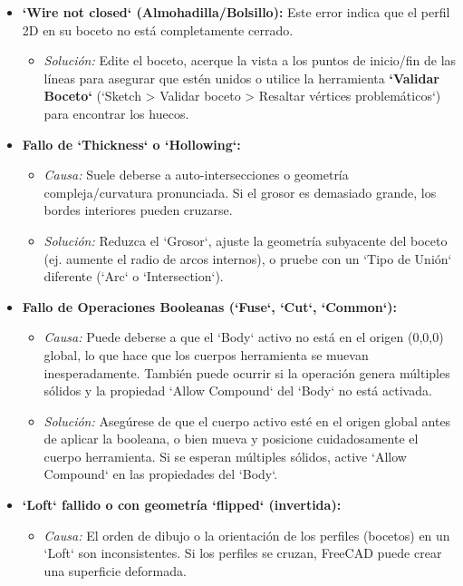 \documentclass[12pt]{article}
\begin{document}
\begin{itemize}[label=\textbullet]
    \item \textbf{`Wire not closed` (Almohadilla/Bolsillo):} Este error indica que el perfil 2D en su boceto no está completamente cerrado.
    \begin{itemize}[label=\textendash]
        \item \textit{Solución:} Edite el boceto, acerque la vista a los puntos de inicio/fin de las líneas para asegurar que estén unidos o utilice la herramienta \textbf{`Validar Boceto`} (`Sketch > Validar boceto > Resaltar vértices problemáticos`) para encontrar los huecos.
    \end{itemize}
    \item \textbf{Fallo de `Thickness` o `Hollowing`:}
    \begin{itemize}[label=\textendash]
        \item \textit{Causa:} Suele deberse a auto-intersecciones o geometría compleja/curvatura pronunciada. Si el grosor es demasiado grande, los bordes interiores pueden cruzarse.
        \item \textit{Solución:} Reduzca el `Grosor`, ajuste la geometría subyacente del boceto (ej. aumente el radio de arcos internos), o pruebe con un `Tipo de Unión` diferente (`Arc` o `Intersection`).
    \end{itemize}
    \item \textbf{Fallo de Operaciones Booleanas (`Fuse`, `Cut`, `Common`):}
    \begin{itemize}[label=\textendash]
        \item \textit{Causa:} Puede deberse a que el `Body` activo no está en el origen (0,0,0) global, lo que hace que los cuerpos herramienta se muevan inesperadamente. También puede ocurrir si la operación genera múltiples sólidos y la propiedad `Allow Compound` del `Body` no está activada.
        \item \textit{Solución:} Asegúrese de que el cuerpo activo esté en el origen global antes de aplicar la booleana, o bien mueva y posicione cuidadosamente el cuerpo herramienta. Si se esperan múltiples sólidos, active `Allow Compound` en las propiedades del `Body`.
    \end{itemize}
    \item \textbf{`Loft` fallido o con geometría `flipped` (invertida):}
    \begin{itemize}[label=\textendash]
        \item \textit{Causa:} El orden de dibujo o la orientación de los perfiles (bocetos) en un `Loft` son inconsistentes. Si los perfiles se cruzan, FreeCAD puede crear una superficie deformada.

\end{itemize}
\end{itemize}
\end{document}
